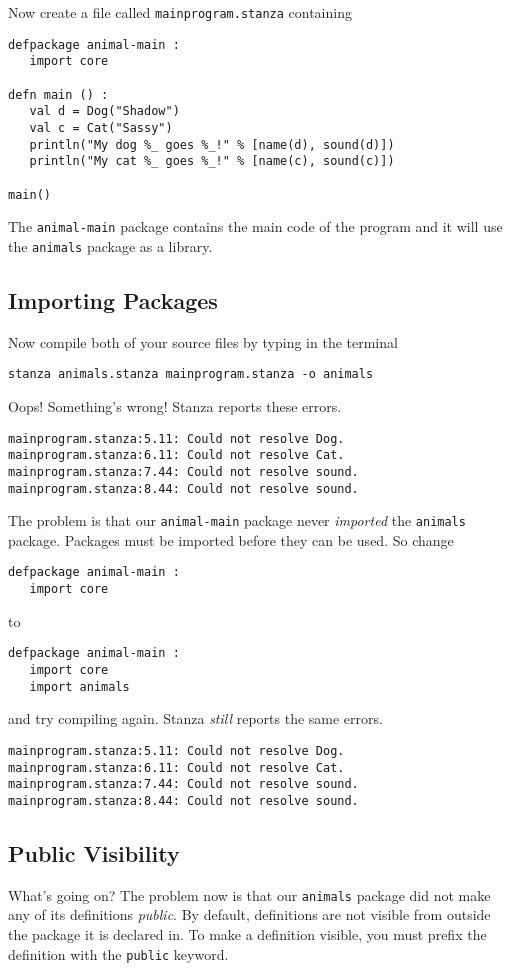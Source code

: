 \documentclass[10pt,oneside]{book}
\begin{document}
Now create a file called \texttt{\frenchspacing mainprogram.stanza} containing
\begin{lstlisting}
defpackage animal-main :
   import core

defn main () :
   val d = Dog("Shadow")
   val c = Cat("Sassy")
   println("My dog %_ goes %_!" % [name(d), sound(d)])
   println("My cat %_ goes %_!" % [name(c), sound(c)])
   
main()
\end{lstlisting}
The \texttt{\frenchspacing animal-main} package contains the main code of the program and it will use the \texttt{\frenchspacing animals} package as a library. 

\subsection*{Importing Packages}
Now compile both of your source files by typing in the terminal
\begin{lstlisting}
stanza animals.stanza mainprogram.stanza -o animals
\end{lstlisting}
Oops! Something's wrong! Stanza reports these errors.
\begin{lstlisting}
mainprogram.stanza:5.11: Could not resolve Dog.
mainprogram.stanza:6.11: Could not resolve Cat.
mainprogram.stanza:7.44: Could not resolve sound.
mainprogram.stanza:8.44: Could not resolve sound.
\end{lstlisting}

The problem is that our \texttt{\frenchspacing animal-main} package never {\em imported} the \texttt{\frenchspacing animals} package. Packages must be imported before they can be used. So change
\begin{lstlisting}
defpackage animal-main :
   import core
\end{lstlisting}
to
\begin{lstlisting}
defpackage animal-main :
   import core
   import animals
\end{lstlisting}
and try compiling again. Stanza {\em still} reports the same errors.
\begin{lstlisting}
mainprogram.stanza:5.11: Could not resolve Dog.
mainprogram.stanza:6.11: Could not resolve Cat.
mainprogram.stanza:7.44: Could not resolve sound.
mainprogram.stanza:8.44: Could not resolve sound.
\end{lstlisting}

\subsection*{Public Visibility}
What's going on? The problem now is that our \texttt{\frenchspacing animals} package did not make any of its definitions {\em public}. By default, definitions are not visible from outside the package it is declared in. To make a definition visible, you must prefix the definition with the \texttt{\frenchspacing public} keyword. 
\end{document}
